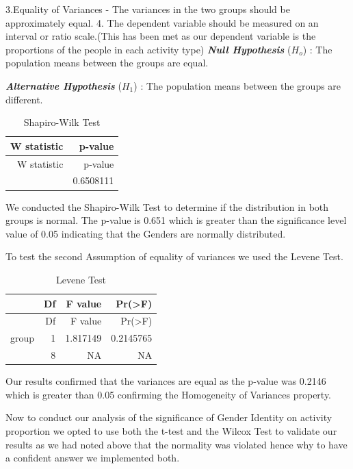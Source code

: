 \documentclass[
  letterpaper,
  DIV=11,
  numbers=noendperiod]{scrartcl}
\begin{document}
3.Equality of Variances - The variances in the two groups should be
approximately equal. 4. The dependent variable should be measured on an
interval or ratio scale.(This has been met as our dependent variable is
the proportions of the people in each activity type) \textbf{\emph{Null
Hypothesis}} (\(H_{o}\)) : The population means between the groups are
equal.

\textbf{\emph{Alternative Hypothesis}} (\(H_{1}\)) : The population
means between the groups are different.

\begin{longtable}[]{@{}rr@{}}
\caption{Shapiro-Wilk Test}\tabularnewline
\toprule\noalign{}
W statistic & p-value \\
\midrule\noalign{}
\endfirsthead
\toprule\noalign{}
W statistic & p-value \\
\midrule\noalign{}
\endhead
\bottomrule\noalign{}
\endlastfoot
0.948502 & 0.6508111 \\
\end{longtable}

We conducted the Shapiro-Wilk Test to determine if the distribution in
both groups is normal. The p-value is 0.651 which is greater than the
significance level value of 0.05 indicating that the Genders are
normally distributed.

To test the second Assumption of equality of variances we used the
Levene Test.

\begin{longtable}[]{@{}lrrr@{}}
\caption{Levene Test}\tabularnewline
\toprule\noalign{}
& Df & F value & Pr(\textgreater F) \\
\midrule\noalign{}
\endfirsthead
\toprule\noalign{}
& Df & F value & Pr(\textgreater F) \\
\midrule\noalign{}
\endhead
\bottomrule\noalign{}
\endlastfoot
group & 1 & 1.817149 & 0.2145765 \\
& 8 & NA & NA \\
\end{longtable}

Our results confirmed that the variances are equal as the p-value was
0.2146 which is greater than 0.05 confirming the Homogeneity of
Variances property.

Now to conduct our analysis of the significance of Gender Identity on
activity proportion we opted to use both the t-test and the Wilcox Test
to validate our results as we had noted above that the normality was
violated hence why to have a confident answer we implemented both.
\end{document}
